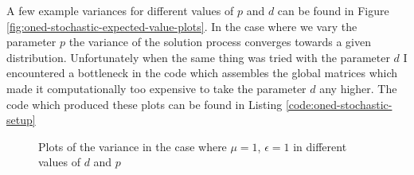 A few example variances for different values of $p$ and $d$ can be found in
Figure \ref{fig:oned-stochastic-expected-value-plots}. In the case where we
vary the parameter $p$ the variance of the solution process converges towards a
given distribution. Unfortunately when the same thing was tried with the
parameter $d$ I encountered a bottleneck in the code which assembles the global
matrices which made it computationally too expensive to take the parameter $d$
any higher. The code which produced these plots can be found in Listing
\ref{code:oned-stochastic-setup}

\begin{figure}
    \centering
    \begin{subfigure}[b]{0.55\textwidth}
        \centering
    \end{subfigure}
    \begin{subfigure}[b]{0.55\textwidth}
        \centering
    \end{subfigure}
    \caption{Plots of the variance in the case where $\mu=1$, $\epsilon = 1$ in
    different values of $d$ and $p$}
\end{figure}

